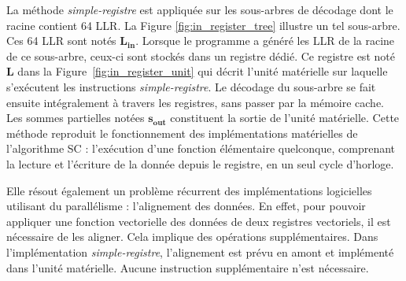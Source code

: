 La méthode \textit{simple-registre} est appliquée sur les sous-arbres de décodage dont le \noeud racine contient 64 LLR. La Figure \ref{fig:in_register_tree} illustre un tel sous-arbre.
Ces 64 LLR sont notés $\mathbold{L_{in}}$.
Lorsque le programme a généré les LLR de la racine de ce sous-arbre, ceux-ci sont stockés dans un registre dédié.
Ce registre est noté $\mathbold{L}$ dans la Figure~\ref{fig:in_register_unit} qui décrit l'unité matérielle sur laquelle s'exécutent les instructions \textit{simple-registre}.
Le décodage du sous-arbre se fait ensuite intégralement à travers les registres, sans passer par la mémoire cache.
Les sommes partielles notées $\mathbold{s_{out}}$ constituent la sortie de l'unité matérielle.
Cette méthode reproduit le fonctionnement des implémentations matérielles de l'algorithme SC : l'exécution d'une fonction élémentaire quelconque, comprenant la lecture et l'écriture de la donnée depuis le registre, en un seul cycle d'horloge.





Elle résout également un problème récurrent des implémentations logicielles utilisant du parallélisme : l'alignement des données. En effet, pour pouvoir appliquer une fonction vectorielle des données de deux registres vectoriels, il est nécessaire de les aligner. Cela implique des opérations supplémentaires. Dans l'implémentation \textit{simple-registre}, l'alignement est prévu en amont et implémenté dans l'unité matérielle. Aucune instruction supplémentaire n'est nécessaire. 

